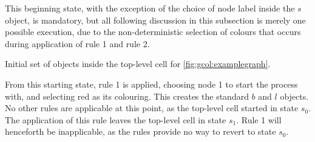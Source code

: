 This beginning state, with the exception of the choice of node label inside the \(s\) object, is mandatory, but all following discussion in this subsection is merely one possible execution, due to the non-deterministic selection of colours that occurs during application of rule 1 and rule 2.


\begin{cpobjectsfloat}
\begin{cpobjects}
\end{cpobjects}
\caption{\label{objs:gcol:obj1}Initial set of objects inside the top-level cell for \autoref{fig:gcol:examplegraph}.}
\end{cpobjectsfloat}

From this starting state, rule 1 is applied, choosing node 1 to start the process with, and selecting red as its colouring.  This creates the standard \(b\) and \(l\) objects.  No other rules are applicable at this point, as the top-level cell started in state \(s_0\).  The application of this rule leaves the top-level cell in state \(s_1\).  Rule 1 will henceforth be inapplicable, as the rules provide no way to revert to state \(s_0\).


